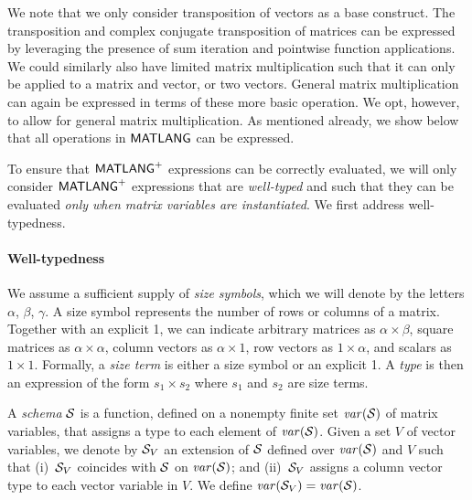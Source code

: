 \begin{remark}
We note that we only consider transposition of vectors as a base construct. The transposition and complex conjugate transposition of matrices can be expressed by  leveraging the presence of sum iteration and pointwise function applications.
We could similarly also have limited matrix multiplication such that it can only be applied to a matrix and vector, or two vectors. General matrix multiplication can again be expressed in terms of these more basic operation. We opt, however, to allow for general matrix multiplication. As mentioned already, we show below that all operations in  $\mathsf{MATLANG}$ can be expressed.
\end{remark}

To ensure that $\mathsf{MATLANG}^{\sf +}$ expressions can be correctly evaluated, we will only consider $\mathsf{MATLANG}^{\sf +}$ expressions that are \textit{well-typed} and such that they can be evaluated \textit{only when matrix variables are instantiated}. 
We first address well-typedness.

\paragraph{Well-typedness} We assume a sufficient supply of \textit{size symbols},
which we will denote by the letters $\alpha$, $\beta$, $\gamma$.
A size symbol represents the number of rows or columns of a
matrix.  Together with an explicit 1, we can indicate
arbitrary matrices as $\alpha \times \beta$, square matrices as
$\alpha \times \alpha$, column vectors as $\alpha \times 1$, row
vectors as $1 \times \alpha$, and scalars as $1 \times 1$.
Formally, a \textit{size term} is either a size symbol or an
explicit 1.  A \textit{type} is then an expression of the form $s_1
\times s_2$ where $s_1$ and $s_2$ are size terms.  

A \textit{schema} $\mathcal{S}$ is a function, defined on a nonempty finite
set $\operatorname{\mathit{var}}(\mathcal{S})$ of matrix variables, that assigns a type to each
element of $\operatorname{\mathit{var}}(\mathcal{S})$. Given a set $V$ of vector variables, 
we denote by $\mathcal{S}_V$ an extension of $\mathcal{S}$ defined over $\operatorname{\mathit{var}}(\mathcal{S})$ and $V$
such that (i)~$\mathcal{S}_V$
coincides with $\mathcal{S}$ on $\operatorname{\mathit{var}}(\mathcal{S})$; and (ii)~$\mathcal{S}_V$ assigns 
a column vector type  to each vector variable
in $V$. We define $\operatorname{\mathit{var}}(\mathcal{S}_V)=\operatorname{\mathit{var}}(\mathcal{S})$.

